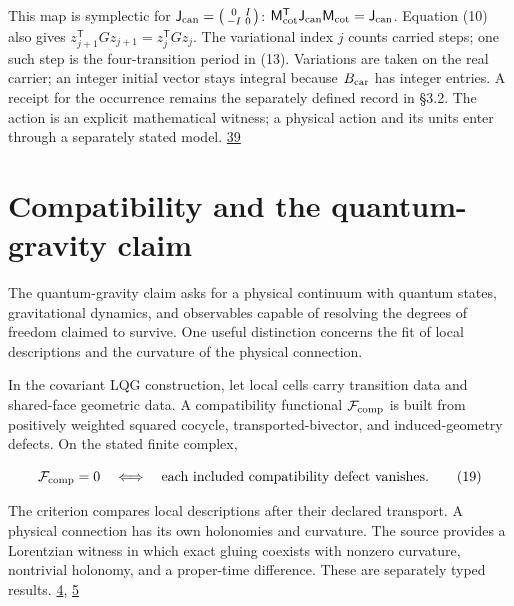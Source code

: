 This map is symplectic for \(\mathsf J_{\rm can}=\bigl(\begin{smallmatrix}0&I\\-I&0\end{smallmatrix}\bigr)\): \(\mathsf M_{\rm cot}^{\mathsf T}\mathsf J_{\rm can}\mathsf M_{\rm cot}=\mathsf J_{\rm can}\). Equation (10) also gives \(z_{j+1}^{\mathsf T}Gz_{j+1}=z_j^{\mathsf T}Gz_j\). The variational index \(j\) counts carried steps; one such step is the four-transition period in (13). Variations are taken on the real carrier; an integer initial vector stays integral because \(B_{\rm car}\) has integer entries. A receipt for the occurrence remains the separately defined record in §3.2. The action is an explicit mathematical witness; a physical action and its units enter through a separately stated model. \href{https://doi.org/10.1017/S096249290100006X}{39}

\hypertarget{compatibility-and-the-quantum-gravity-claim}{%
\section{Compatibility and the quantum-gravity claim}\label{compatibility-and-the-quantum-gravity-claim}}

The quantum-gravity claim asks for a physical continuum with quantum states, gravitational dynamics, and observables capable of resolving the degrees of freedom claimed to survive. One useful distinction concerns the fit of local descriptions and the curvature of the physical connection.

In the covariant LQG construction, let local cells carry transition data and shared-face geometric data. A compatibility functional \(\mathcal F_{\rm comp}\) is built from positively weighted squared cocycle, transported-bivector, and induced-geometry defects. On the stated finite complex,

\[
\mathcal F_{\rm comp}=0
\quad\Longleftrightarrow\quad
\text{each included compatibility defect vanishes}.
\tag{19}
\]

The criterion compares local descriptions after their declared transport. A physical connection has its own holonomies and curvature. The source provides a Lorentzian witness in which exact gluing coexists with nonzero curvature, nontrivial holonomy, and a proper-time difference. These are separately typed results. \href{https://github.com/Coppalini-Architecture/coppalini-architecture/blob/9b7122ca5c3712c2c294e2bc5097276d0ba9817b/papers/motion-and-difference/motion-and-difference-2026-07-17.pdf}{4}, \href{https://github.com/Coppalini-Architecture/coppalini-architecture/blob/9b7122ca5c3712c2c294e2bc5097276d0ba9817b/papers/continuum-closure-covariant-lqg/continuum-closure-covariant-lqg-v1.1.pdf}{5}

